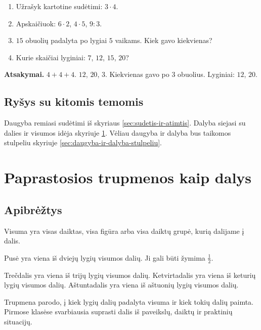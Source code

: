 \begin{enumerate}
\item Užrašyk kartotine sudėtimi: \(3\cdot 4\).
\item Apskaičiuok: \(6\cdot 2\), \(4\cdot 5\), \(9:3\).
\item \(15\) obuolių padalyta po lygiai \(5\) vaikams. Kiek gavo kiekvienas?
\item Kurie skaičiai lyginiai: \(7\), \(12\), \(15\), \(20\)?
\end{enumerate}

\textbf{Atsakymai.} \(4+4+4\). \(12\), \(20\), \(3\). Kiekvienas gavo po \(3\) obuolius. Lyginiai: \(12\), \(20\).

\subsection{Ryšys su kitomis temomis}

Daugyba remiasi sudėtimi iš skyriaus \ref{sec:sudetis-ir-atimtis}. Dalyba siejasi su dalies ir visumos idėja skyriuje \ref{sec:paprastosios-trupmenos-kaip-dalys}. Vėliau daugyba ir dalyba bus taikomos stulpeliu skyriuje \ref{sec:daugyba-ir-dalyba-stulpeliu}.

\section{Paprastosios trupmenos kaip dalys}\label{sec:paprastosios-trupmenos-kaip-dalys}

\subsection{Apibrėžtys}

\begin{apibreztis}
Visuma yra visas daiktas, visa figūra arba visa daiktų grupė, kurią dalijame į dalis.
\end{apibreztis}

\begin{apibreztis}
Pusė yra viena iš dviejų lygių visumos dalių. Ji gali būti žymima \(\frac{1}{2}\).
\end{apibreztis}

\begin{apibreztis}
Trečdalis yra viena iš trijų lygių visumos dalių. Ketvirtadalis yra viena iš keturių lygių visumos dalių. Aštuntadalis yra viena iš aštuonių lygių visumos dalių.
\end{apibreztis}

\begin{apibreztis}
Trupmena parodo, į kiek lygių dalių padalyta visuma ir kiek tokių dalių paimta. Pirmose klasėse svarbiausia suprasti dalis iš paveikslų, daiktų ir praktinių situacijų.
\end{apibreztis}

